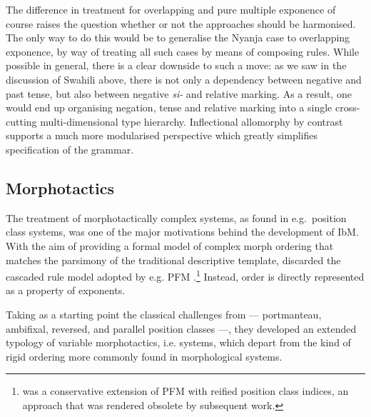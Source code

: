 \documentclass[output=paper
	        ,collection
	        ,collectionchapter
 	        ,biblatex
                ,babelshorthands
                ,newtxmath
                ,draftmode
                ,colorlinks, citecolor=brown
]{langscibook}
\begin{document}
\begin{exe}
\begin{xlist}
\begin{exe}
\begin{xlist}
The difference in treatment for overlapping and pure multiple
exponence of course raises the question whether or not the approaches
should be harmonised. The only way to do this would be to generalise
the Nyanja case to overlapping exponence, by way of treating all such
cases by means of composing rules. While possible in general, there is
a clear downside to such a move: as we saw in the discussion of
Swahili above, there is not only a dependency between negative and
past tense, but also between negative \textit{si-} and relative
marking. As a result, one would end up organising negation, tense and
relative marking into a single cross-cutting multi-dimensional type
hierarchy. Inflectional allomorphy by contrast supports a much more
modularised perspective which greatly simplifies specification of the
grammar.  

\subsection{Morphotactics}
\label{sec:Mortax}

The treatment of morphotactically complex systems, as found in e.g.\
position class systems, was one of the major motivations behind the
development of IbM. With the aim of providing a formal model of
complex morph ordering that matches the parsimony of the traditional
descriptive template, \citet{Crysmann:Bonami:2016} discarded the
cascaded rule model adopted by e.g. PFM
\citep{Stump01}.\footnote{\citet{Crysmann12} was a conservative
  extension of PFM with reified position class indices, an approach
  that was rendered obsolete by subsequent work.} Instead, order is
directly represented as a property of exponents.

Taking as a starting point the classical challenges from
\citet{Stump93} --- portmanteau, ambifixal, reversed, and parallel
position classes ---, they developed an extended typology of variable
morphotactics, i.e. systems, which depart from the kind of rigid
ordering more commonly found in morphological systems.


\end{xlist}
\end{exe}
\end{xlist}
\end{exe}
\end{document}
